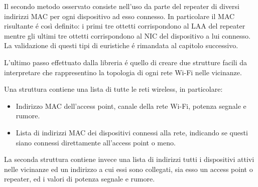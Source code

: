 Il secondo metodo osservato consiste nell'uso da parte del repeater di diversi indirizzi MAC per ogni dispositivo ad esso connesso.
In particolare il MAC risultante \'e cos\`i definito: i primi tre ottetti corrispondono al LAA del repeater mentre gli ultimi tre ottetti corrispondono al NIC del dispositivo a lui connesso.
La validazione di questi tipi di euristiche \'e rimandata al capitolo successivo.

L'ultimo passo effettuato dalla libreria \'e quello di creare due strutture facili da interpretare che rappresentino la topologia di ogni rete Wi-Fi nelle vicinanze.

Una struttura contiene una lista di tutte le reti wireless, in particolare:

\begin{itemize}
	\item Indirizzo MAC dell'access point, canale della rete Wi-Fi, potenza segnale e rumore.
	\item Lista di indirizzi MAC dei dispositivi connessi alla rete, indicando se questi siano connessi direttamente all'access point o meno.
\end{itemize}

La seconda struttura contiene invece una lista di indirizzi tutti i dispositivi attivi nelle vicinanze ed un indirizzo a cui essi sono collegati, sia esso un access point o repeater, ed i valori di potenza segnale e rumore.

